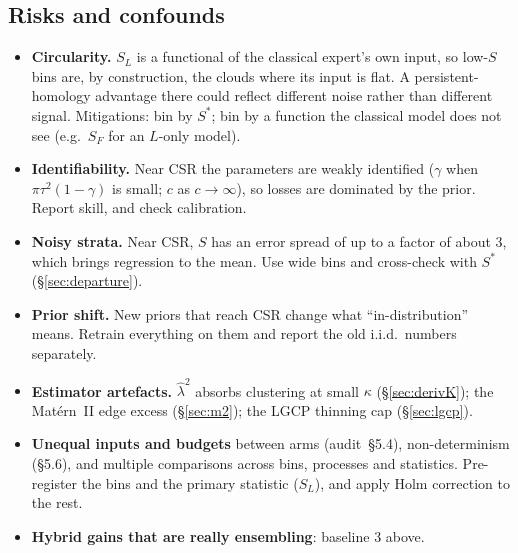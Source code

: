 \documentclass[10pt,a4paper]{article}
\begin{document}
\subsection{Risks and confounds}\label{sec:risks}
\begin{itemize}
\item \textbf{Circularity.} $S_L$ is a functional of the classical expert's own input, so low-$S$ bins are, by construction, the clouds where its input is flat. A persistent-homology advantage there could reflect different noise rather than different signal. Mitigations: bin by $S^\ast$; bin by a function the classical model does not see (e.g.\ $S_F$ for an $L$-only model).
\item \textbf{Identifiability.} Near CSR the parameters are weakly identified ($\gamma$ when $\pi\tau^2(1-\gamma)$ is small; $c$ as $c\to\infty$), so losses are dominated by the prior. Report skill, and check calibration.
\item \textbf{Noisy strata.} Near CSR, $S$ has an error spread of up to a factor of about 3, which brings regression to the mean. Use wide bins and cross-check with $S^\ast$ (\S\ref{sec:departure}).
\item \textbf{Prior shift.} New priors that reach CSR change what ``in-distribution'' means. Retrain everything on them and report the old i.i.d.\ numbers separately.
\item \textbf{Estimator artefacts.} $\hat\lambda^2$ absorbs clustering at small $\kappa$ (\S\ref{sec:derivK}); the Mat\'ern~II edge excess (\S\ref{sec:m2}); the LGCP thinning cap (\S\ref{sec:lgcp}).
\item \textbf{Unequal inputs and budgets} between arms (audit~\S5.4), non-determinism (\S5.6), and multiple comparisons across bins, processes and statistics. Pre-register the bins and the primary statistic ($S_L$), and apply Holm correction to the rest.
\item \textbf{Hybrid gains that are really ensembling}: baseline 3 above.
\end{itemize}



\end{document}
